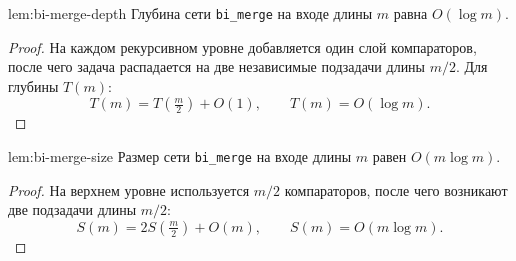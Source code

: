 \begin{Lemma}{}{lem:bi-merge-depth}
	Глубина сети \texttt{bi\_merge} на входе длины $m$ равна $O(\log m)$.
\end{Lemma}

\begin{proof}
	На каждом рекурсивном уровне добавляется один слой компараторов, после чего задача распадается на две независимые подзадачи длины $m/2$.
	Для глубины $T(m)$:
	\[
	T(m)=T\!\left(\tfrac{m}{2}\right)+O(1),
	\qquad T(m)=O(\log m).
	\]
\end{proof}

\begin{Lemma}{}{lem:bi-merge-size}
	Размер сети \texttt{bi\_merge} на входе длины $m$ равен $O(m\log m)$.
\end{Lemma}

\begin{proof}
	На верхнем уровне используется $m/2$ компараторов, после чего возникают две подзадачи длины $m/2$:
	\[
	S(m)=2S\!\left(\tfrac{m}{2}\right)+O(m),
	\qquad S(m)=O(m\log m).
	\]
\end{proof}
